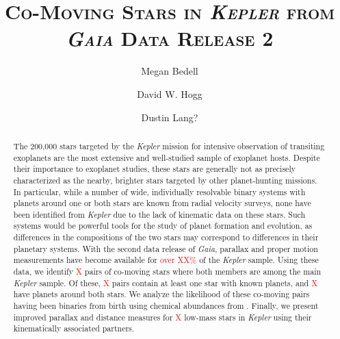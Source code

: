 \documentclass[twocolumn, trackchanges]{aastex62}
\newcommand{\todo}[1]{\textcolor{red}{#1}}  %
\newcommand{\kepler}{\emph{Kepler}\xspace}
\newcommand{\gaia}{\emph{Gaia}\xspace}
\begin{document}
\graphicspath{ {figures/} }


\title{\textsc{Co-Moving Stars in \kepler from \gaia Data Release 2}}

\author{Megan Bedell}

\author{David W. Hogg}

\author{Dustin Lang?}



\begin{abstract}

The 200,000 stars targeted by the \kepler mission for intensive observation of transiting exoplanets are the most extensive and well-studied sample of exoplanet hosts. Despite their importance to exoplanet studies, these stars are generally not as precisely characterized as the nearby, brighter stars targeted by other planet-hunting missions. In particular, while a number of wide, individually resolvable binary systems with planets around one or both stars are known from radial velocity surveys, none have been identified from \kepler due to the lack of kinematic data on these stars. Such systems would be powerful tools for the study of planet formation and evolution, as differences in the compositions of the two stars may correspond to differences in their planetary systems. 
With the second data release of \gaia, parallax and proper motion measurements have become available for \todo{over XX\%} of the \kepler sample. 
Using these data, we identify \todo{X} pairs of co-moving stars where both members are among the main \kepler sample. Of these, \todo{X} pairs contain at least one star with known planets, and \todo{X} have planets around both stars. 
We analyze the likelihood of these co-moving pairs having been binaries from birth using chemical abundances from \citet{brewer18}. %
Finally, we present improved parallax and distance measures for \todo{X} low-mass stars in \kepler using their kinematically associated partners.

\end{abstract}
\end{document}
